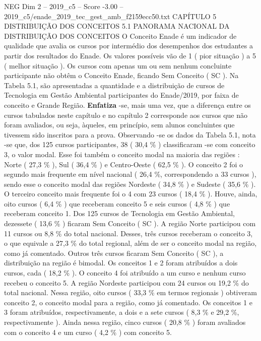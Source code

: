 \begin{textsample}{NEG Dim 2 – 2019\_c5 – Score -3.00 – 2019\_c5/enade\_2019\_tec\_gest\_amb\_f2159ecc50.txt}  \label{ex:f2_neg_092}
CAPÍTULO 5 DISTRIBUIÇÃO DOS CONCEITOS 5.1 PANORAMA NACIONAL DA DISTRIBUIÇÃO DOS CONCEITOS O Conceito Enade é um indicador de qualidade que avalia os cursos por intermédio dos desempenhos dos estudantes a partir dos resultados do Enade.
Os valores possíveis vão de 1 ( pior situação ) a 5 ( melhor situação ).
Os cursos com apenas um ou sem nenhum concluinte participante não obtêm o Conceito Enade, ficando Sem Conceito ( SC ).
Na Tabela 5.1, são apresentadas a quantidade e a distribuição de cursos de Tecnologia em Gestão Ambiental participantes do Enade/2019, por faixa de conceito e Grande Região. \textbf{Enfatiza} -se, mais uma vez, que a diferença entre os cursos tabulados neste capítulo e no capítulo 2 corresponde aos cursos que não foram avaliados, ou seja, àqueles, em princípio, sem alunos concluintes que tivessem sido inscritos para a prova.
Observando -se os dados da Tabela 5.1, nota -se que, dos 125 cursos participantes, 38 ( 30,4 \% ) classificaram -se com conceito 3, o valor modal.
Esse foi também o conceito modal na maioria das regiões : Norte ( 27,3 \% ), Sul ( 36,4 \% ) e Centro-Oeste ( 62,5 \% ).
O conceito 2 foi o segundo mais frequente em nível nacional ( 26,4 \%, correspondendo a 33 cursos ), sendo esse o conceito modal das regiões Nordeste ( 34,8 \% ) e Sudeste ( 35,6 \% ).
O terceiro conceito mais frequente foi o 4 com 23 cursos ( 18,4 \% ).
Houve, ainda, oito cursos ( 6,4 \% ) que receberam conceito 5 e seis cursos ( 4,8 \% ) que receberam conceito 1.
Dos 125 cursos de Tecnologia em Gestão Ambiental, dezessete ( 13,6 \% ) ficaram Sem Conceito ( SC ).
A região Norte participou com 11 cursos ou 8,8 \% do total nacional.
Desses, três cursos receberam o conceito 3, o que equivale a 27,3 \% do total regional, além de ser o conceito modal na região, como já comentado.
Outros três cursos ficaram Sem Conceito ( SC ), a distribuição na região é bimodal.
Os conceitos 1 e 2 foram atribuídos a dois cursos, cada ( 18,2 \% ).
O conceito 4 foi atribuído a um curso e nenhum curso recebeu o conceito 5.
A região Nordeste participou com 24 cursos ou 19,2 \% do total nacional.
Nessa região, oito cursos ( 33,3 \% em termos regionais ) obtiveram conceito 2, o conceito modal para a região, como já comentado.
Os conceitos 1 e 3 foram atribuídos, respectivamente, a dois e a sete cursos ( 8,3 \% e 29,2 \%, respectivamente ).
Ainda nessa região, cinco cursos ( 20,8 \% ) foram avaliados com o conceito 4 e um curso ( 4,2 \% ) com conceito 5.

\end{textsample}
